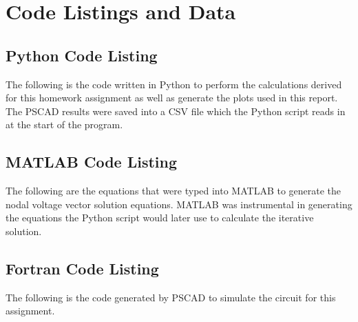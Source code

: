 \documentclass[10pt, oneside, letterpaper]{article}
\begin{document}
\newpage
\section{Code Listings and Data}

\subsection{Python Code Listing}
\label{code-listing-python}
The following is the code written in Python to perform the calculations derived for this homework assignment as well as generate the plots used in this report. The PSCAD results were saved into a CSV file which the Python script reads in at the start of the program.


\subsection{MATLAB Code Listing}
\label{code-listing-matlab}
The following are the equations that were typed into MATLAB to generate the nodal voltage vector solution equations. MATLAB was instrumental in generating the equations the Python script would later use to calculate the iterative solution.


\subsection{Fortran Code Listing}
\label{code-listing-fortran}
The following is the code generated by PSCAD to simulate the circuit for this assignment.

\end{document}
